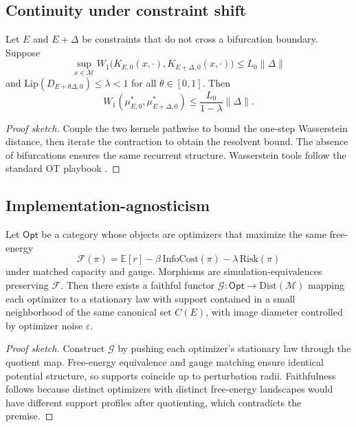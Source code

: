 \documentclass[11pt]{article}
\newcommand{\E}{\mathbb{E}}
\newcommand{\1}{\mathbbm{1}}
\newcommand{\Wone}{W_1}
\newcommand{\Lip}{\mathrm{Lip}}
\begin{document}
\subsection{Continuity under constraint shift}
\begin{theorem}\label{thm:continuity}
Let $E$ and $E+\Delta$ be constraints that do not cross a bifurcation boundary. Suppose
\[
\sup_{x \in \mathcal{M}} \Wone\bigl(K_{E,0}(x,\cdot), K_{E+\Delta,0}(x,\cdot)\bigr) \le L_0 \|\Delta\|
\]
and $\Lip(D_{E+\theta \Delta,0}) \le \lambda < 1$ for all $\theta \in [0,1]$. Then
\[
\Wone(\mu^*_{E,0}, \mu^*_{E+\Delta,0}) \le \frac{L_0}{1 - \lambda} \|\Delta\|.
\]
\end{theorem}

\begin{proof}[Proof sketch]
Couple the two kernels pathwise to bound the one-step Wasserstein distance, then iterate the contraction to obtain the resolvent bound. The absence of bifurcations ensures the same recurrent structure. Wasserstein tools follow the standard OT playbook \parencite{Villani2009}.
\end{proof}

\subsection{Implementation-agnosticism}
\begin{theorem}\label{thm:functor}
Let $\mathsf{Opt}$ be a category whose objects are optimizers that maximize the same free-energy
\[
\mathcal{F}(\pi) = \E[r] - \beta\,\mathrm{InfoCost}(\pi) - \lambda\,\mathrm{Risk}(\pi)
\]
under matched capacity and gauge. Morphisms are simulation-equivalences preserving $\mathcal{F}$. Then there exists a faithful functor $\mathcal{G}: \mathsf{Opt} \to \mathrm{Dist}(\mathcal{M})$ mapping each optimizer to a stationary law with support contained in a small neighborhood of the same canonical set $C(E)$, with image diameter controlled by optimizer noise $\varepsilon$.
\end{theorem}

\begin{proof}[Proof sketch]
Construct $\mathcal{G}$ by pushing each optimizer's stationary law through the quotient map. Free-energy equivalence and gauge matching ensure identical potential structure, so supports coincide up to perturbation radii. Faithfulness follows because distinct optimizers with distinct free-energy landscapes would have different support profiles after quotienting, which contradicts the premise.
\end{proof}
\end{document}
